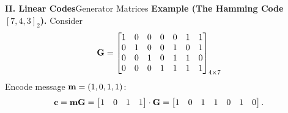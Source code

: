 
\begin{frame}{\textbf{II. Linear Codes}}{Generator Matrices}
\small
{}
\vfill
\textbf{Example (The Hamming Code $[7,4,3]_2$).}\; 
Consider \[
\mathbf{G} = \begin{bmatrix}
	1&0&0&0&0&1&1\\
	0&1&0&0&1&0&1\\
	0&0&1&0&1&1&0\\
	0&0&0&1&1&1&1
\end{bmatrix}_{4\times 7}
\] Encode message $\mathbf{m} = (1,0,1,1)$:
\[
\mathbf{c} = \mathbf{m}\mathbf{G} = \begin{bmatrix}
	1 & 0 & 1 & 1
\end{bmatrix}
\cdot \mathbf{G} = \begin{bmatrix}
	1 & 0 & 1 & 1 & 0 & 1 & 0
\end{bmatrix}.
\]

\end{frame}
